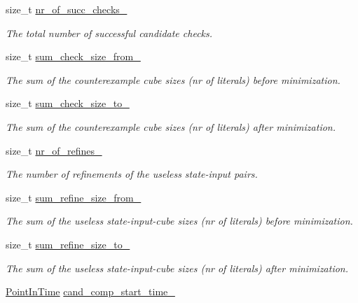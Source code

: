 \begin{DoxyCompactItemize}
size\-\_\-t \hyperlink{classLearnStatisticsSAT_aa059a13f6afcf98a04be072aa5ce3f1d}{nr\-\_\-of\-\_\-succ\-\_\-checks\-\_\-}
\begin{DoxyCompactList}\small\item\em The total number of successful candidate checks. \end{DoxyCompactList}\item 
size\-\_\-t \hyperlink{classLearnStatisticsSAT_a2d6735aa7c84c50967b3bb779d2a0a86}{sum\-\_\-check\-\_\-size\-\_\-from\-\_\-}
\begin{DoxyCompactList}\small\item\em The sum of the counterexample cube sizes (nr of literals) before minimization. \end{DoxyCompactList}\item 
size\-\_\-t \hyperlink{classLearnStatisticsSAT_ae805d5a2fc2f724d325136a9f30e6b4b}{sum\-\_\-check\-\_\-size\-\_\-to\-\_\-}
\begin{DoxyCompactList}\small\item\em The sum of the counterexample cube sizes (nr of literals) after minimization. \end{DoxyCompactList}\item 
size\-\_\-t \hyperlink{classLearnStatisticsSAT_afa9b3c4bb24e7f6ebd9593dfb916c11e}{nr\-\_\-of\-\_\-refines\-\_\-}
\begin{DoxyCompactList}\small\item\em The number of refinements of the useless state-\/input pairs. \end{DoxyCompactList}\item 
size\-\_\-t \hyperlink{classLearnStatisticsSAT_a7f36ead437ee4833c96342d812551cce}{sum\-\_\-refine\-\_\-size\-\_\-from\-\_\-}
\begin{DoxyCompactList}\small\item\em The sum of the useless state-\/input-\/cube sizes (nr of literals) before minimization. \end{DoxyCompactList}\item 
size\-\_\-t \hyperlink{classLearnStatisticsSAT_ab64cce193c819cdd5c3a6838d99eb0a7}{sum\-\_\-refine\-\_\-size\-\_\-to\-\_\-}
\begin{DoxyCompactList}\small\item\em The sum of the useless state-\/input-\/cube sizes (nr of literals) after minimization. \end{DoxyCompactList}\item 
\hyperlink{Stopwatch_8h_af3a9f634f27bed7e98dbc23e5c6f807d}{Point\-In\-Time} \hyperlink{classLearnStatisticsSAT_a73f2f0e2ee619df05b22261e7b691320}{cand\-\_\-comp\-\_\-start\-\_\-time\-\_\-}

\end{DoxyCompactItemize}
